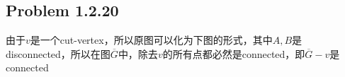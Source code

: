 \subsection*{Problem 1.2.20}
由于$v$是一个cut-vertex，所以原图可以化为下图的形式，其中$A, B$是disconnected，所以在图$\overline{G}$中，除去$v$的所有点都必然是connected，即$\overline{G} - v$是connected \\


